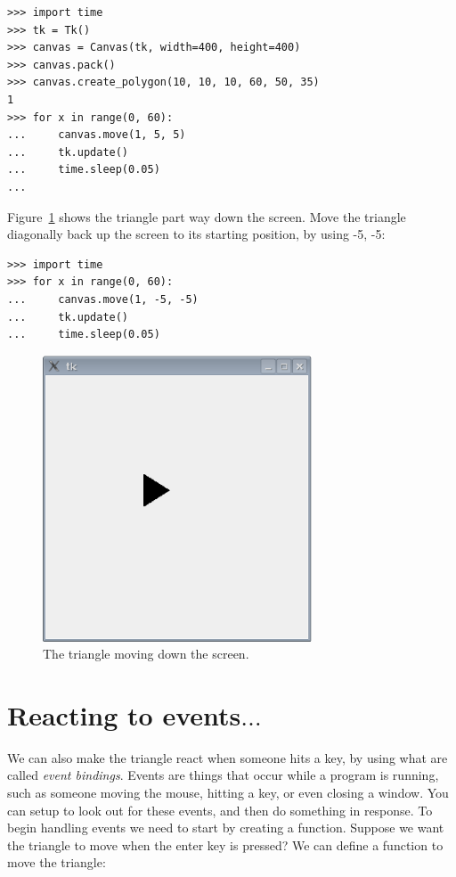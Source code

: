 \begin{listingignore}
\begin{verbatim}
>>> import time
>>> tk = Tk()
>>> canvas = Canvas(tk, width=400, height=400)
>>> canvas.pack()
>>> canvas.create_polygon(10, 10, 10, 60, 50, 35)
1
>>> for x in range(0, 60):
...     canvas.move(1, 5, 5)
...     tk.update()
...     time.sleep(0.05)
...
\end{verbatim}
\end{listingignore}

Figure~\ref{fig45} shows the triangle part way down the screen. Move the triangle diagonally back up the screen to its starting position, by using -5, -5:

\begin{listing}
\begin{verbatim}
>>> import time
>>> for x in range(0, 60):
...     canvas.move(1, -5, -5)
...     tk.update()
...     time.sleep(0.05)
\end{verbatim}
\end{listing}

\begin{figure}
\begin{center}
\includegraphics[width=80mm]{eps/figure45.eps}
\end{center}
\caption{The triangle moving down the screen.}\label{fig45}
\end{figure}

\section{Reacting to events$\ldots$}

We can also make the triangle react when someone hits a key, by using what are called \emph{event bindings}.  Events are things that occur while a program is running, such as someone moving the mouse, hitting a key, or even closing a window. You can setup  to look out for these events, and then do something in response. To begin handling events we need to start by creating a function. Suppose we want the triangle to move when the enter key is pressed? We can define a function to move the triangle:

